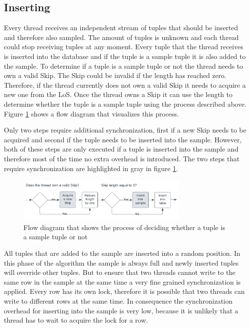 \documentclass[sigconf,nonacm]{acmart}
\begin{document}
    \subsection{Inserting}
        Every thread receives an independent stream of tuples that should be inserted and therefore also sampled. The amount of tuples is unknown and each thread could stop receiving tuples at any moment. Every tuple  that the thread receives is inserted into the database and if the tuple is a sample tuple it is also added to the sample. To determine if a tuple is a sample tuple or not the thread needs to own a valid Skip. The Skip could be invalid if the length has reached zero. Therefore, if the thread currently does not own a valid Skip it needs to acquire a new one from the LoS. Once the thread owns a Skip it can use the length to determine whether the tuple is a sample tuple using the process described above. Figure \ref{fig:inserting} shows a flow diagram that visualizes this process.

        Only two steps require additional synchronization, first if a new Skip needs to be acquired and second if the tuple needs to be inserted into the sample. However, both of these steps are only executed if a tuple is inserted into the sample and therefore most of the time no extra overhead is introduced. The two steps that require synchronization are highlighted in gray in figure \ref{fig:inserting}.
        \begin{figure}[h]
            \includegraphics[height=2.2cm]{figure3.pdf}
            \caption{Flow diagram that shows the process of deciding whether a tuple is a sample tuple or not}
            \label{fig:inserting}
        \end{figure}        

        All tuples that are added to the sample are inserted into a random position. In this phase of the algorithm the sample is always full and newly inserted tuples will override other tuples. But to ensure that two threads cannot write to the same row in the sample at the same time a very fine grained synchronization is applied. Every row has its own lock, therefore it is possible that two threads can write to different rows at the same time. In consequence the synchronization overhead for inserting into the sample is very low, because it is unlikely that a thread has to wait to acquire the lock for a row. 
\end{document}
